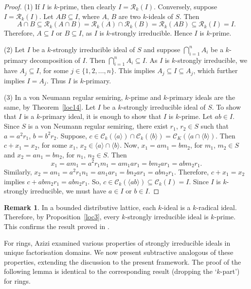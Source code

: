 \documentclass[11pt,english]{amsart}
\theoremstyle{definition}
\newtheorem{remark}[theorem]{Remark}
\numberwithin{equation}{section}
\begin{document}
\begin{proof}
	(1) If $I$ is $k$-prime, then clearly $I=\mathcal{R}_k(I)$. Conversely, suppose $I=\mathcal{R}_k(I)$. Let $AB \subseteq I$, where $A$, $B$ are two $k$-ideals of $S$. Then \[A\cap B \subseteq \mathcal{R}_k(A\cap B)=\mathcal{R}_k(A)\cap \mathcal{R}_k(B)=\mathcal{R}_k(AB)\subseteq \mathcal{R}_k(I)=I.\] Therefore, $A \subseteq I$ or $B \subseteq I$, as $I$ is $k$-strongly irreducible. Hence $I$ is $k$-prime.
    
        (2) Let $I$ be a $k$-strongly irreducible ideal of $S$ and suppose $\bigcap\limits_{i=1}^n A_i$ be a $k$-primary decomposition  of $I$. Then $\bigcap\limits_{i=1}^n A_i \subseteq I$. As $I$ is $k$-strongly irreducible, we have $A
        _j \subseteq I$, for some $j\in \{1,2,...,n\}$. This implies $A_j \subseteq I \subseteq A_j$, which further implies $I=A_j$. Thus $I$ is $k$-primary.
        
        (3) In a von Neumann regular semiring, $k$-prime and $k$-primary ideals are the same, by Theorem~\ref{loc14}. Let $I$ be a $k$-strongly irreducible ideal of $S$. To show that $I$ is a $k$-primary ideal, it is enough to show that $I$ is $k$-prime. Let $ab \in I$. Since $S$ is a von Neumann regular semiring, there exist $r_1$, $r_2 \in S$ such that $a=a^2r_1$, $b =b^2r_2$. Suppose, $c\in \mathcal{C}_k(\langle a \rangle) \cap \mathcal{C}_k(\langle b \rangle) = \mathcal{C}_K(\langle a\cap \langle b \rangle)$. Then $c+x_1=x_2$, for some $x_1$, $x_2 \in \langle a \rangle\cap \langle b\rangle$. Now, $x_1=am_1=bm_2$, for $m_1$, $m_2\in S$ and $x_2=an_1=bn_2$, for $n_1$, $n_2 \in S$. Then \[x_1=am_1=a^2r_1m_1=am_1ar_1=bm_2ar_1=abm_2r_1.\] Similarly, $x_2=an_1=a^2r_1n_1=an_1ar_1=bn_2ar_1=abn_2r_1$. Therefore, $c+x_1=x_2$ implies $c+abm_2r_1=abn_2r_1$. So, $c\in \mathcal{C}_k(\langle ab \rangle)\subseteq \mathcal{C}_k(I)=I$. Since $I$ is $k$-strongly irreducible, we must have $a\in I$ or $b\in I$.
\end{proof}

\begin{remark}
    In a bounded distributive lattice, each $k$-ideal is a $k$-radical ideal. Therefore, by Proposition~\ref{loc3}, every $k$-strongly irreducible ideal is $k$-prime. This confirms the result proved in \cite[Theorem 5]{Iseki56}.
\end{remark}

For rings, Azizi examined various properties of strongly irreducible ideals in unique factorisation domains\cite[Theorem 2.2]{Azizi08}. We now present subtractive analogous of these properties, extending the discussion to the present framework. The proof of the following lemma is identical to the corresponding result (dropping the `$k$-part') for rings.
\end{document}
